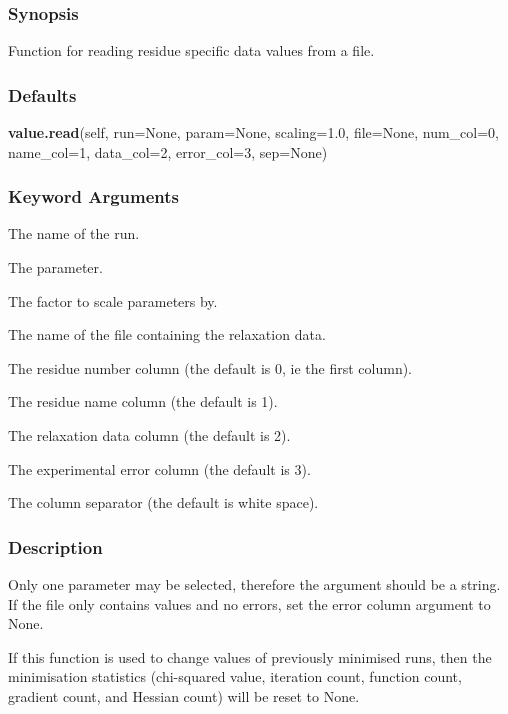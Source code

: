   
 \subsubsection{Synopsis} 

 Function for reading residue specific data values from a file. 
  

  
 \subsubsection{Defaults} 

 \textsf{\textbf{value.read}(self, run=None, param=None, scaling=1.0, file=None, num\_col=0, name\_col=1, data\_col=2, error\_col=3, sep=None)} 

  
 \subsubsection{Keyword Arguments} 

   The name of the run.   

   The parameter.   

   The factor to scale parameters by.   

   The name of the file containing the relaxation data.   

   The residue number column (the default is 0, ie the first column).   

   The residue name column (the default is 1).   

   The relaxation data column (the default is 2).   

   The experimental error column (the default is 3).   

   The column separator (the default is white space).  

  

  
 \subsubsection{Description} 

 Only one parameter may be selected, therefore the  argument should be a string.  If the file only contains values and no errors, set the error column argument to None. 
  

 If this function is used to change values of previously minimised runs, then the minimisation statistics (chi-squared value, iteration count, function count, gradient count, and Hessian count) will be reset to None. 
  

